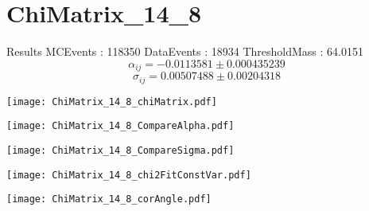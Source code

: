 \documentclass[a4paper,12pt]{article}
\begin{document}
\section{ChiMatrix\_14\_8}
\begin{minipage}{0.49\linewidth} Results \newline
MCEvents : 118350\newline
DataEvents : 18934 \newline
ThresholdMass : 64.0151\\
$$\alpha_{ij} = -0.0113581\pm 0.000435239$$
$$\sigma_{ij} = 0.00507488\pm 0.00204318$$
\end{minipage}\hfill
\begin{minipage}{0.49\linewidth} 
\texttt{[image: ChiMatrix\_14\_8\_chiMatrix.pdf]}\\
\end{minipage}
\hfill
\begin{minipage}{0.49\linewidth} 
\texttt{[image: ChiMatrix\_14\_8\_CompareAlpha.pdf]}\\
\end{minipage}
\hfill
\begin{minipage}{0.49\linewidth} 
\texttt{[image: ChiMatrix\_14\_8\_CompareSigma.pdf]}\\
\end{minipage}
\begin{minipage}{0.49\linewidth} 
\texttt{[image: ChiMatrix\_14\_8\_chi2FitConstVar.pdf]}\\
\end{minipage}
\hfill
\begin{minipage}{0.49\linewidth} 
\texttt{[image: ChiMatrix\_14\_8\_corAngle.pdf]}\\
\end{minipage}
\end{document}
